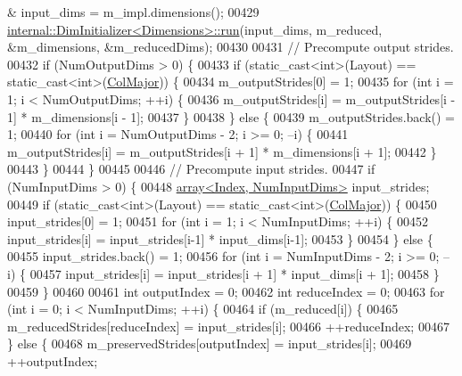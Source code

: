 \begin{DoxyCode}
      & input\_dims = m\_impl.dimensions();
00429     \hyperlink{struct_eigen_1_1internal_1_1_dim_initializer}{internal::DimInitializer<Dimensions>::run}(input\_dims, 
      m\_reduced, &m\_dimensions, &m\_reducedDims);
00430 
00431     \textcolor{comment}{// Precompute output strides.}
00432     \textcolor{keywordflow}{if} (NumOutputDims > 0) \{
00433       \textcolor{keywordflow}{if} (static\_cast<int>(Layout) == static\_cast<int>(\hyperlink{group__enums_ggaacded1a18ae58b0f554751f6cdf9eb13a0cbd4bdd0abcfc0224c5fcb5e4f6669a}{ColMajor})) \{
00434         m\_outputStrides[0] = 1;
00435         \textcolor{keywordflow}{for} (\textcolor{keywordtype}{int} i = 1; i < NumOutputDims; ++i) \{
00436           m\_outputStrides[i] = m\_outputStrides[i - 1] * m\_dimensions[i - 1];
00437         \}
00438       \} \textcolor{keywordflow}{else} \{
00439         m\_outputStrides.back() = 1;
00440         \textcolor{keywordflow}{for} (\textcolor{keywordtype}{int} i = NumOutputDims - 2; i >= 0; --i) \{
00441           m\_outputStrides[i] = m\_outputStrides[i + 1] * m\_dimensions[i + 1];
00442         \}
00443       \}
00444     \}
00445 
00446     \textcolor{comment}{// Precompute input strides.}
00447     \textcolor{keywordflow}{if} (NumInputDims > 0) \{
00448       \hyperlink{class_eigen_1_1array}{array<Index, NumInputDims>} input\_strides;
00449       \textcolor{keywordflow}{if} (static\_cast<int>(Layout) == static\_cast<int>(\hyperlink{group__enums_ggaacded1a18ae58b0f554751f6cdf9eb13a0cbd4bdd0abcfc0224c5fcb5e4f6669a}{ColMajor})) \{
00450         input\_strides[0] = 1;
00451         \textcolor{keywordflow}{for} (\textcolor{keywordtype}{int} i = 1; i < NumInputDims; ++i) \{
00452           input\_strides[i] = input\_strides[i-1] * input\_dims[i-1];
00453         \}
00454       \} \textcolor{keywordflow}{else} \{
00455         input\_strides.back() = 1;
00456         \textcolor{keywordflow}{for} (\textcolor{keywordtype}{int} i = NumInputDims - 2; i >= 0; --i) \{
00457           input\_strides[i] = input\_strides[i + 1] * input\_dims[i + 1];
00458         \}
00459       \}
00460 
00461       \textcolor{keywordtype}{int} outputIndex = 0;
00462       \textcolor{keywordtype}{int} reduceIndex = 0;
00463       \textcolor{keywordflow}{for} (\textcolor{keywordtype}{int} i = 0; i < NumInputDims; ++i) \{
00464         \textcolor{keywordflow}{if} (m\_reduced[i]) \{
00465           m\_reducedStrides[reduceIndex] = input\_strides[i];
00466           ++reduceIndex;
00467         \} \textcolor{keywordflow}{else} \{
00468           m\_preservedStrides[outputIndex] = input\_strides[i];
00469           ++outputIndex;

\end{DoxyCode}
